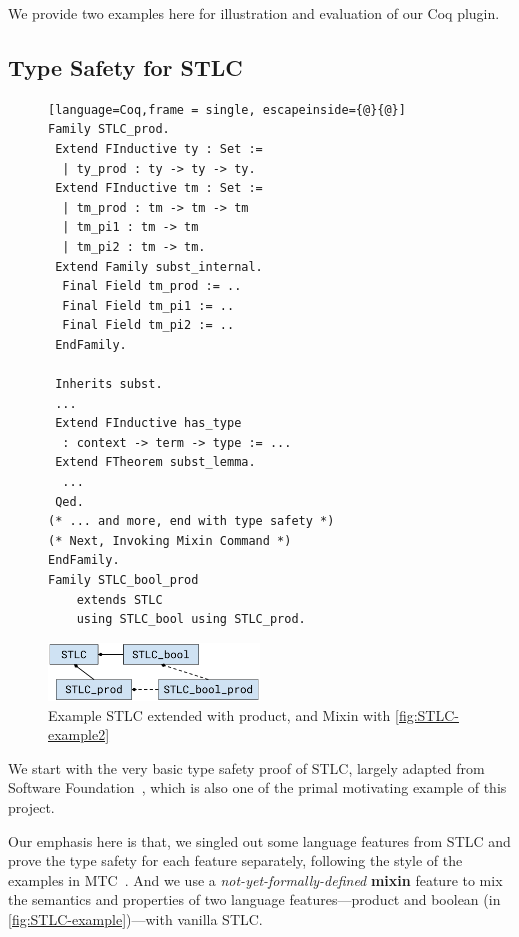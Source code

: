 We provide two examples here for illustration and evaluation of our Coq plugin. 

\subsection{Type Safety for STLC}

\begin{figure}
\begin{lstlisting}[language=Coq,frame = single, escapeinside={@}{@}]
Family STLC_prod.
 Extend FInductive ty : Set :=
  | ty_prod : ty -> ty -> ty.
 Extend FInductive tm : Set :=
  | tm_prod : tm -> tm -> tm  
  | tm_pi1 : tm -> tm  
  | tm_pi2 : tm -> tm.
 Extend Family subst_internal.
  Final Field tm_prod := ..
  Final Field tm_pi1 := ..
  Final Field tm_pi2 := ..
 EndFamily.

 Inherits subst.
 ...
 Extend FInductive has_type 
  : context -> term -> type := ...
 Extend FTheorem subst_lemma.
  ... 
 Qed.
(* ... and more, end with type safety *)
(* Next, Invoking Mixin Command *)
EndFamily.
Family STLC_bool_prod 
    extends STLC 
    using STLC_bool using STLC_prod.
\end{lstlisting}
\includegraphics[width=0.5\textwidth]{coqexmaple/STLC-inheritances.pdf}
\caption{Example STLC extended with product, and Mixin with \cref{fig:STLC-example2}}
\end{figure}

We start with the very basic type safety proof of STLC, largely adapted
from Software Foundation~\cite{pierce2014software}, which is also one of
the primal motivating example of this project. 


Our emphasis here is that, we singled out some language features from
STLC and prove the type safety for each feature separately, following
the style of the examples in MTC~\cite{delaware2013,forsta2020}.
And we use a \textit{not-yet-formally-defined} \textbf{mixin} feature
to mix the semantics and properties of two language features---product
and boolean (in \cref{fig:STLC-example})---with vanilla STLC.


